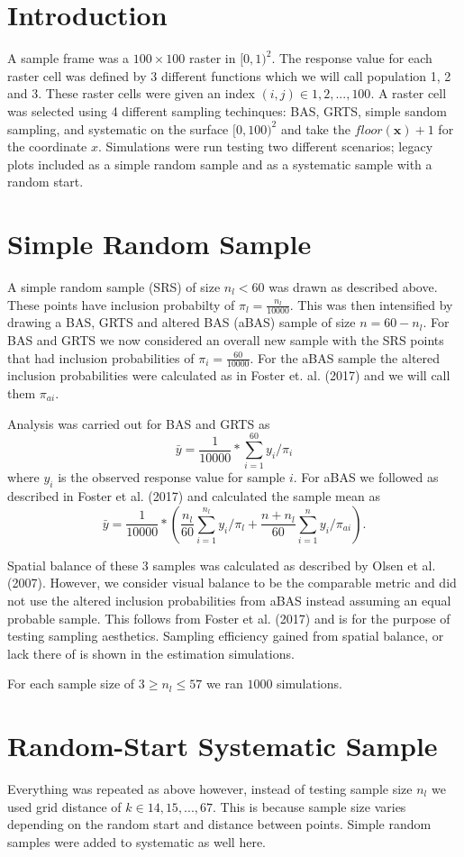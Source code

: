 \documentclass[]{report}
\title{}
\author{}
\begin{document}
\section*{Introduction}
A sample frame was a $100 \times 100$ raster in $[0,1)^2$. The response value for each raster cell was defined by 3 different functions which we will call population 1, 2 and 3. These raster cells were given an index $(i,j) \in 1,2,...,100$. A raster cell was selected using 4 different sampling techinques: BAS, GRTS, simple sandom sampling, and systematic on the surface $[0,100)^2$ and take the $floor(\boldsymbol{x}) + 1$ for the coordinate $x$. Simulations were run testing two different scenarios; legacy plots included as a simple random sample and as a systematic sample with a random start.

\section*{Simple Random Sample}
A simple random sample (SRS) of size $n_l < 60$ was drawn as described above. These points have inclusion probabilty of $\pi_l = \frac{n_l}{10000}$. This was then intensified by drawing a BAS, GRTS and altered BAS (aBAS) sample of size $n = 60 - n_l$. For BAS and GRTS we now considered an overall new sample with the SRS points that had inclusion probabilities of $\pi_i = \frac{60}{10000}$. For the aBAS sample the altered inclusion probabilities were calculated as in Foster et. al. (2017) and we will call them $\pi_{ai}$.

Analysis was carried out for BAS and GRTS as
$$ \bar{y} = \frac{1}{10000} * \sum_{i = 1}^{60} y_i/\pi_i $$
where $y_i$ is the observed response value for sample $i$. For aBAS we followed as described in Foster et al. (2017) and calculated the sample mean as
$$ \bar{y} = \frac{1}{10000} * \left( \frac{n_l}{60}\sum_{i = 1}^{n_l} y_i/\pi_l  + \frac{n + n_l}{60}\sum_{i = 1}^{n} y_i/\pi_{ai} \right).$$

Spatial balance of these 3 samples was calculated as described by Olsen et al. (2007). However, we consider visual balance to be the comparable metric and did not use the altered inclusion probabilities from aBAS instead assuming an equal probable sample. This follows from Foster et al. (2017) and is for the purpose of testing sampling aesthetics. Sampling efficiency gained from spatial balance, or lack there of is shown in the estimation simulations.

For each sample size of $3 \geq n_l \leq 57$ we ran $1000$ simulations.

\section*{Random-Start Systematic Sample}
Everything was repeated as above however, instead of testing sample size $n_l$ we used grid distance of $k \in 14, 15,...,67$. This is because sample size varies depending on the random start and distance between points. Simple random samples were added to systematic as well here.
\end{document}
